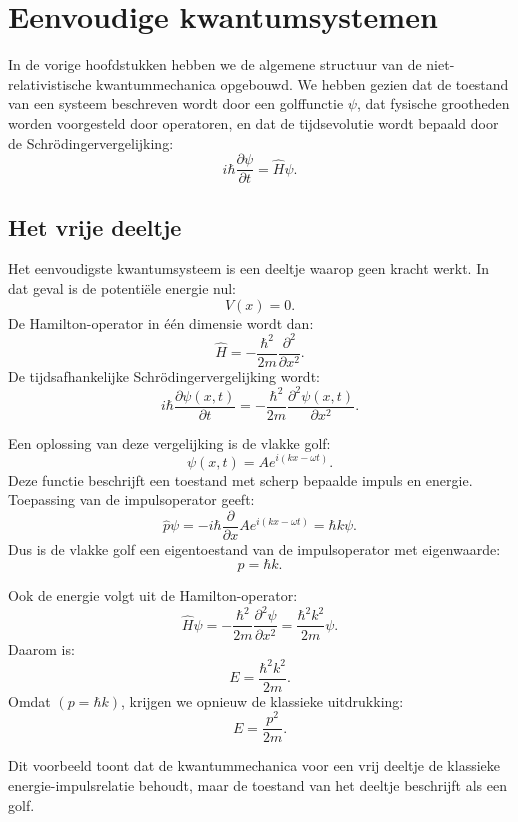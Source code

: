 \documentclass{report} %
\begin{document}
    \chapter{Eenvoudige kwantumsystemen}

    In de vorige hoofdstukken hebben we de algemene structuur van de
    niet-relativistische kwantummechanica opgebouwd. We hebben gezien dat de
    toestand van een systeem beschreven wordt door een golffunctie \(\psi\), dat
    fysische grootheden worden voorgesteld door operatoren, en dat de tijdsevolutie
    wordt bepaald door de Schrödingervergelijking:
    \[
        i\hbar\frac{\partial \psi}{\partial t}=\hat{H}\psi.
    \]


    \section{Het vrije deeltje}

    Het eenvoudigste kwantumsysteem is een deeltje waarop geen kracht werkt. In dat geval is de potentiële energie nul:
    \[
        V(x)=0.
    \]
    De Hamilton-operator in één dimensie wordt dan:
    \[
        \hat{H}
        =
        -\frac{\hbar^2}{2m}\frac{\partial^2}{\partial x^2}.
    \]
    De tijdsafhankelijke Schrödingervergelijking wordt:
    \[
        i\hbar\frac{\partial \psi(x,t)}{\partial t}
        =
        -\frac{\hbar^2}{2m}\frac{\partial^2 \psi(x,t)}{\partial x^2}.
    \]

    Een oplossing van deze vergelijking is de vlakke golf:
    \[
        \psi(x,t)=Ae^{i(kx-\omega t)}.
    \]
    Deze functie beschrijft een toestand met scherp bepaalde impuls en energie. Toepassing van de impulsoperator geeft:
    \[
        \hat{p}\psi
        =
        -i\hbar\frac{\partial}{\partial x}
        Ae^{i(kx-\omega t)}
        =
        \hbar k \psi.
    \]
    Dus is de vlakke golf een eigentoestand van de impulsoperator met eigenwaarde:
    \[
        p=\hbar k.
    \]

    Ook de energie volgt uit de Hamilton-operator:
    \[
        \hat{H}\psi
        =
        -\frac{\hbar^2}{2m}\frac{\partial^2 \psi}{\partial x^2}
        =
        \frac{\hbar^2 k^2}{2m}\psi.
    \]
    Daarom is:
    \[
        E=\frac{\hbar^2 k^2}{2m}.
    \]
    Omdat $(p=\hbar k)$, krijgen we opnieuw de klassieke uitdrukking:
    \[
        E=\frac{p^2}{2m}.
    \]

    Dit voorbeeld toont dat de kwantummechanica voor een vrij deeltje de klassieke energie-impulsrelatie behoudt, maar de toestand van het deeltje beschrijft als een golf.
\end{document}
